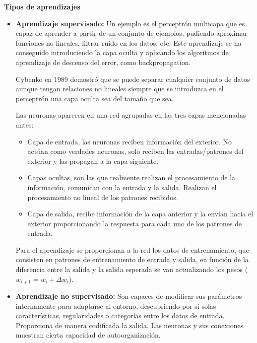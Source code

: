\documentclass[12pt, twoside, openright]{report} %
\begin{document}
\textbf{Tipos de aprendizajes}
\begin{itemize}
	\item \textbf{Aprendizaje supervisado:} Un ejemplo es el perceptrón multicapa que es capaz de aprender a partir de un conjunto de ejemplos, pudiendo aproximar funciones no lineales, filtrar ruido en los datos, etc. Este aprendizaje se ha conseguido introduciendo la capa oculta y aplicando los algoritmos de aprendizaje de descenso del error, como backpropagation.

	      Cybenko en 1989 demostró que se puede separar cualquier conjunto de datos aunque tengan relaciones no lineales siempre que se introduzca en el perceptrón una capa oculta sea del tamaño que sea.

	      Las neuronas aparecen en una red agrupadas en las tres capas mencionadas antes:
	      \begin{itemize}
		      \item Capa de entrada, las neuronas reciben información del exterior. No actúan como verdades neuronas, solo reciben las entradas/patrones del exterior y las propagan a la capa siguiente.
		      \item Capas ocultas, son las que realmente realizan el procesamiento de la información, comunican con la entrada y la salida. Realizan el procesamiento no lineal de los patrones recibidos.
		      \item Capa de salida, recibe información de la capa anterior y la envían hacia el exterior proporcionando la respuesta para cada uno de los patrones de entrada.
	      \end{itemize}

	      Para el aprendizaje se proporcionan a la red los datos de entrenamiento, que consisten en patrones de entrenamiento de entrada y salida, en función de la diferencia entre la salida y la salida esperada se van actualizando los pesos ($w_{i+1}=w_i+\Delta w_i$).
	\item \textbf{Aprendizaje no supervisado:} Son capaces de modificar sus parámetros internamente para adaptarse al entorno, descubriendo por si solas características, regularidades o categorías entre los datos de entrada. Proporciona de manera codificada la salida. Las neuronas y sus conexiones muestran cierta capacidad de autoorganización.
\end{itemize}
\end{document}
